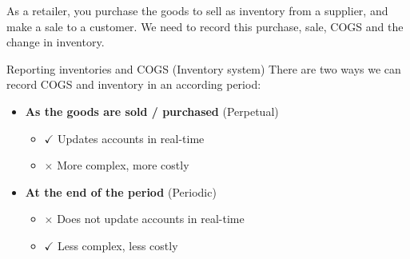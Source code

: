 As a retailer, you purchase the goods to sell as inventory from a supplier, and make a sale to a customer. We need to record this purchase, sale, COGS and the change in inventory.

\begin{theorem}
    {Reporting inventories and COGS (Inventory system)}
    There are two ways we can record COGS and inventory in an according period:
    \begin{itemize}
        \item \textbf{As the goods are sold / purchased} (Perpetual)
              \begin{itemize}
                  \item[] $\checkmark$ Updates accounts in real-time
                  \item[] $\times$ More complex, more costly
              \end{itemize}
        \item \textbf{At the end of the period} (Periodic)
              \begin{itemize}
                  \item[] $\times$ Does not update accounts in real-time
                  \item[] $\checkmark$ Less complex, less costly
              \end{itemize}
    \end{itemize}
\end{theorem}


